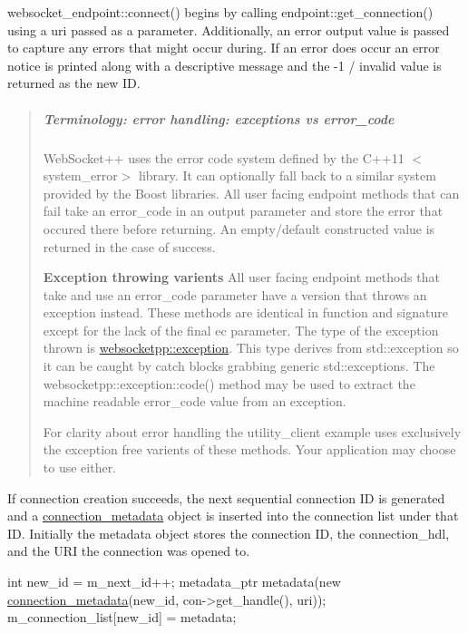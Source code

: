 {\ttfamily websocket\+\_\+endpoint\+::connect()} begins by calling {\ttfamily endpoint\+::get\+\_\+connection()} using a uri passed as a parameter. Additionally, an error output value is passed to capture any errors that might occur during. If an error does occur an error notice is printed along with a descriptive message and the -\/1 / \textquotesingle{}invalid\textquotesingle{} value is returned as the new ID.

\begin{quote}
\subparagraph*{Terminology\+: {\ttfamily error handling\+: exceptions vs error\+\_\+code}}

Web\+Socket++ uses the error code system defined by the C++11 {\ttfamily $<$system\+\_\+error$>$} library. It can optionally fall back to a similar system provided by the Boost libraries. All user facing endpoint methods that can fail take an {\ttfamily error\+\_\+code} in an output parameter and store the error that occured there before returning. An empty/default constructed value is returned in the case of success.

{\bfseries Exception throwing varients} All user facing endpoint methods that take and use an {\ttfamily error\+\_\+code} parameter have a version that throws an exception instead. These methods are identical in function and signature except for the lack of the final ec parameter. The type of the exception thrown is {\ttfamily \mbox{\hyperlink{classwebsocketpp_1_1exception}{websocketpp\+::exception}}}. This type derives from {\ttfamily std\+::exception} so it can be caught by catch blocks grabbing generic {\ttfamily std\+::exception}s. The {\ttfamily websocketpp\+::exception\+::code()} method may be used to extract the machine readable {\ttfamily error\+\_\+code} value from an exception.

For clarity about error handling the utility\+\_\+client example uses exclusively the exception free varients of these methods. Your application may choose to use either. \end{quote}


If connection creation succeeds, the next sequential connection ID is generated and a {\ttfamily \mbox{\hyperlink{classconnection__metadata}{connection\+\_\+metadata}}} object is inserted into the connection list under that ID. Initially the metadata object stores the connection ID, the {\ttfamily connection\+\_\+hdl}, and the U\+RI the connection was opened to.


\begin{DoxyCode}
\textcolor{keywordtype}{int} new\_id = m\_next\_id++;
metadata\_ptr metadata(\textcolor{keyword}{new} \mbox{\hyperlink{classconnection__metadata}{connection\_metadata}}(new\_id, con->get\_handle(), uri));
m\_connection\_list[new\_id] = metadata;
\end{DoxyCode}


